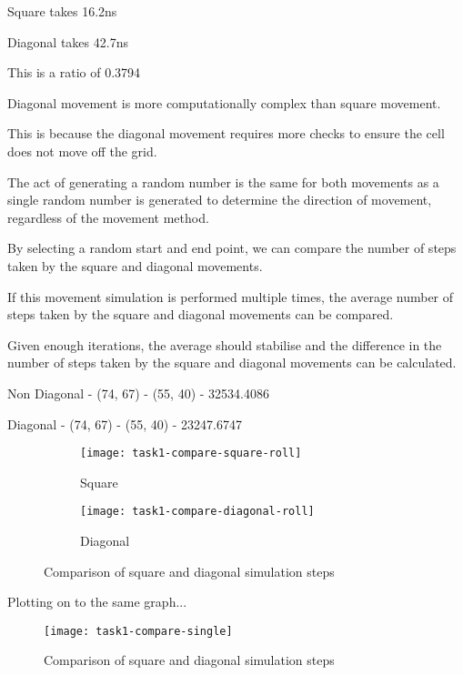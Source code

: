 Square takes 16.2ns

Diagonal takes 42.7ns

This is a ratio of 0.3794

Diagonal movement is more computationally complex than square movement.

This is because the diagonal movement requires more checks to ensure the cell does not move off the grid.

The act of generating a random number is the same for both movements as a single random number is generated to determine the direction of movement, regardless of the movement method.

\clearpage

By selecting a random start and end point, we can compare the number of steps taken by the square and diagonal movements.

If this movement simulation is performed multiple times, the average number of steps taken by the square and diagonal movements can be compared.

Given enough iterations, the average should stabilise and the difference in the number of steps taken by the square and diagonal movements can be calculated.

Non Diagonal - (74, 67) - (55, 40) - 32534.4086

Diagonal - (74, 67) - (55, 40) - 23247.6747

\begin{figure}[ht]
    \centering
    \begin{subfigure}{\textwidth}
        \texttt{[image: task1-compare-square-roll]}
        \caption[Square]{Square}
        \label{fig:task1-compare-square-roll}
    \end{subfigure}

    \begin{subfigure}{\textwidth}
        \texttt{[image: task1-compare-diagonal-roll]}
        \caption[Diagonal]{Diagonal}
        \label{fig:task1-compare-diagonal-roll}
    \end{subfigure}

    \caption[Comparison of square and diagonal simulation steps]{Comparison of square and diagonal simulation steps}
    \label{fig:task1-compare-roll}
\end{figure}

Plotting on to the same graph...

\begin{figure}[ht]
    \centering
    \texttt{[image: task1-compare-single]}
    \caption[Comparison of square and diagonal simulation steps]{Comparison of square and diagonal simulation steps}
    \label{fig:task1-compare-single}
\end{figure}

